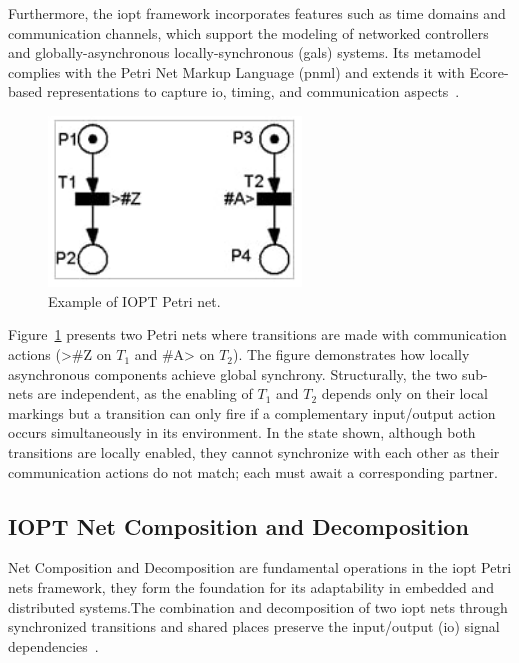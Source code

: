Furthermore, the \gls{iopt} framework incorporates features such as time domains and communication channels, which support the modeling of networked controllers and globally-asynchronous locally-synchronous (\gls{gals}) systems. Its metamodel complies with the Petri Net Markup Language (\gls{pnml}) and extends it with Ecore-based representations to capture \gls{io}, timing, and communication aspects~\cite{iopttools}.


\begin{figure}[htbp]
  \centering
  \includegraphics[width=0.6\textwidth]{Chapters/Figures/petrisplit.jpg}
  \caption{Example of IOPT Petri net.}
  \label{fig:petrisplit}
\end{figure}


Figure~\ref{fig:petrisplit} presents two Petri nets where transitions are made with communication actions (>\#Z on $T_1$ and \#A> on $T_2$). The figure demonstrates how locally asynchronous components achieve global synchrony. Structurally, the two sub-nets are independent, as the enabling of $T_1$ and $T_2$ depends only on their local markings but a transition can only fire if a complementary input/output action occurs simultaneously in its environment. In the state shown, although both transitions are locally enabled, they cannot synchronize with each other as their communication actions do not match; each must await a corresponding partner.



\subsection{IOPT Net Composition and Decomposition}
\label{sub:net_addicion}

Net Composition and Decomposition are fundamental operations in the \gls{iopt} Petri nets framework, they form the foundation for its adaptability in embedded and distributed systems.The combination and decomposition of two \gls{iopt} nets through synchronized transitions and shared places preserve the input/output (\gls{io}) signal dependencies~\cite{add1}.

